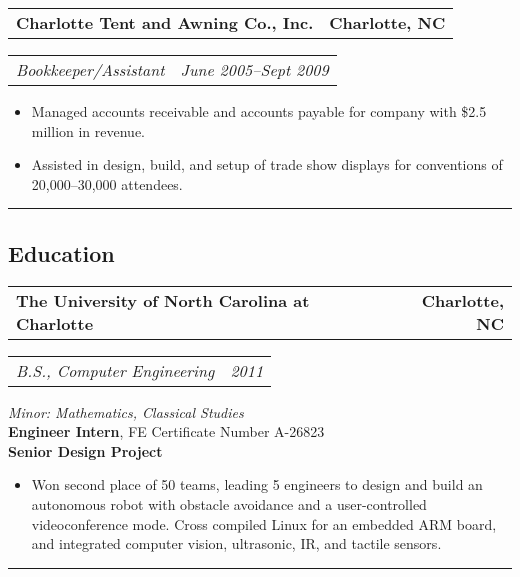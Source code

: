 \documentclass[10pt,letterpaper]{article}
\newcommand{\headerrow}[2]{%
    \begin{tabularx}{\linewidth}{Xr}
	    #1 & #2 \\
    \end{tabularx}
}
\begin{document}
	\headerrow{\textbf{Charlotte Tent and Awning Co., Inc.}}{\textbf{Charlotte, NC}}
	\headerrow{\textit{Bookkeeper/Assistant}}{\textit{June 2005--Sept 2009}}
    \begin{itemize}[label=--]
        \item Managed accounts receivable and accounts payable for company with
            \$2.5 million in revenue.

        \item Assisted in design, build, and setup of trade show displays for
            conventions of 20,000--30,000 attendees.
	\end{itemize}

\vspace{2pt}
\hrule
\vspace{-0.4em}
\subsection*{Education}
	\headerrow{\textbf{The University of North Carolina at Charlotte}}
		{\textbf{Charlotte, NC}}
	\headerrow{\textit{B.S., Computer Engineering}}{\textit{2011}}
		\textit{Minor: Mathematics, Classical Studies} \\
        \textbf{Engineer Intern},  FE Certificate Number A-26823 \\
        \textbf{Senior Design Project}
        \begin{itemize}[label=--]
            \item Won second place of 50 teams, leading 5 engineers to design
                and build an autonomous robot with obstacle avoidance and a
                user-controlled videoconference mode.  Cross compiled Linux for
                an embedded ARM board, and integrated computer vision,
                ultrasonic, IR, and tactile sensors.
        \end{itemize}

\vspace{2pt}
\hrule
\vspace{-0.4em}
\end{document}
